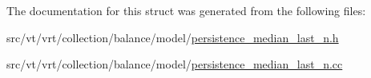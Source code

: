 The documentation for this struct was generated from the following files\+:\begin{DoxyCompactItemize}
\item 
src/vt/vrt/collection/balance/model/\hyperlink{persistence__median__last__n_8h}{persistence\+\_\+median\+\_\+last\+\_\+n.\+h}\item 
src/vt/vrt/collection/balance/model/\hyperlink{persistence__median__last__n_8cc}{persistence\+\_\+median\+\_\+last\+\_\+n.\+cc}\end{DoxyCompactItemize}
